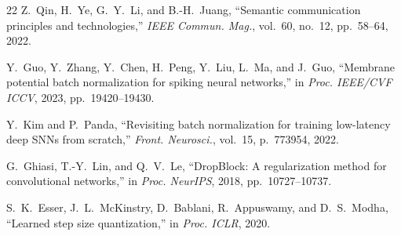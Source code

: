 \documentclass[conference]{IEEEtran}
\begin{document}
\begin{thebibliography}{22}
Z.~Qin, H.~Ye, G.~Y.~Li, and B.-H.~Juang, ``Semantic communication principles and technologies,'' \emph{IEEE Commun. Mag.}, vol.~60, no.~12, pp.~58--64, 2022.

Y.~Guo, Y.~Zhang, Y.~Chen, H.~Peng, Y.~Liu, L.~Ma, and J.~Guo, ``Membrane potential batch normalization for spiking neural networks,'' in \emph{Proc. IEEE/CVF ICCV}, 2023, pp.~19420--19430.

Y.~Kim and P.~Panda, ``Revisiting batch normalization for training low-latency deep SNNs from scratch,'' \emph{Front. Neurosci.}, vol.~15, p.~773954, 2022.

G.~Ghiasi, T.-Y.~Lin, and Q.~V.~Le, ``DropBlock: A regularization method for convolutional networks,'' in \emph{Proc. NeurIPS}, 2018, pp.~10727--10737.

S.~K.~Esser, J.~L.~McKinstry, D.~Bablani, R.~Appuswamy, and D.~S.~Modha, ``Learned step size quantization,'' in \emph{Proc. ICLR}, 2020.

\end{thebibliography}
\end{document}
